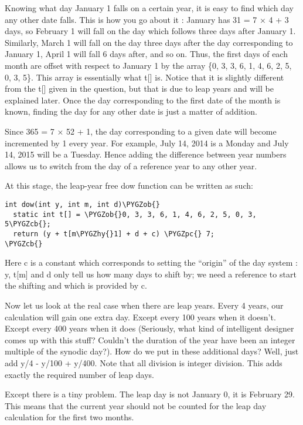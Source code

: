 \documentclass[letterpaper,10pt,english]{sphinxmanual}
\def\PYGZob{\char`\{}
\def\PYGZcb{\char`\}}
\def\PYGZpc{\char`\%}
\def\PYGZhy{\char`\-}
\begin{document}
Knowing  what day January 1 falls on a certain year, it is easy to find which  day any other date falls. This is how you go about it : January has 31 =  7 × 4 + 3 days, so February 1 will fall on the day which follows three  days after January 1. Similarly, March 1 will fall on the day three days  after the day corresponding to January 1, April 1 will fall 6 days  after, and so on. Thus, the first days of each month are offset with  respect to January 1 by the array \{0, 3, 3, 6, 1, 4, 6, 2, 5, 0, 3, 5\}.  This array is essentially what t{[}{]} is. Notice that it is slightly  different from the t{[}{]} given in the question, but that is due to leap  years and will be explained later. Once the day corresponding to the  first date of the month is known, finding the day for any other date is  just a matter of addition.

Since  365 = 7 × 52 + 1, the day corresponding to a given date will become  incremented by 1 every year. For example, July 14, 2014 is a Monday and  July 14, 2015 will be a Tuesday. Hence adding the difference between  year numbers allows us to switch from the day of a reference year to any  other year.

At this stage, the leap-year free dow function can be written as such:

\begin{Verbatim}[commandchars=\\\{\}]
int dow(int y, int m, int d)\PYGZob{}
  static int t[] = \PYGZob{}0, 3, 3, 6, 1, 4, 6, 2, 5, 0, 3, 5\PYGZcb{};
  return (y + t[m\PYGZhy{}1] + d + c) \PYGZpc{} 7;
\PYGZcb{}
\end{Verbatim}

Here  c is a constant which corresponds to setting the ``origin'' of the day  system : y, t{[}m{]} and d only tell us how many days to shift by; we need a  reference to start the shifting and which is provided by c.

Now  let us look at the real case when there are leap years. Every 4 years,  our calculation will gain one extra day. Except every 100 years when it  doesn't. Except every 400 years when it does (Seriously, what kind of  intelligent designer comes up with this stuff? Couldn't the duration of  the year have been an integer multiple of the synodic day?). How do we  put in these additional days? Well, just add y/4 - y/100 + y/400. Note  that all division is integer division. This adds exactly the required  number of leap days.

Except  there is a tiny problem. The leap day is not January 0, it is February  29. This means that the current year should not be counted for the leap  day calculation for the first two months.
\end{document}
